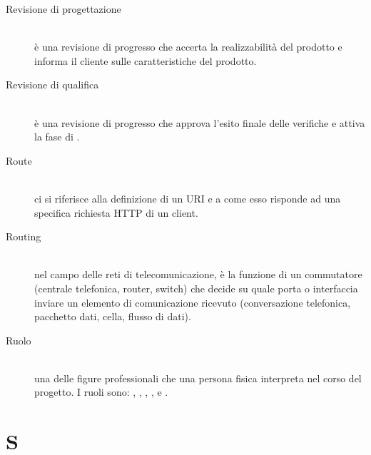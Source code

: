 \documentclass[12pt,a4paper]{article}
\begin{document}
\begin{description}
\item[Revisione di progettazione] 
\hfill\\è una revisione di progresso che accerta la realizzabilità del prodotto e informa il cliente sulle caratteristiche del prodotto.

\item[Revisione di qualifica] 
\hfill\\è una revisione di progresso che approva l'esito finale delle verifiche e attiva la fase di .

\item[Route] 
\hfill\\ci si riferisce alla definizione di un URI e a come esso risponde ad una specifica richiesta HTTP di un client.

\item[Routing] 
\hfill\\nel campo delle reti di telecomunicazione, è la funzione di un commutatore (centrale telefonica, router, switch) che decide su quale porta o interfaccia inviare un elemento di comunicazione ricevuto (conversazione telefonica, pacchetto dati, cella, flusso di dati).

\item[Ruolo] 
\hfill\\una delle figure professionali che una persona fisica interpreta nel corso del progetto. I ruoli sono: , , , ,  e .
\end{description}

\newpage

\section{S}
\end{document}
